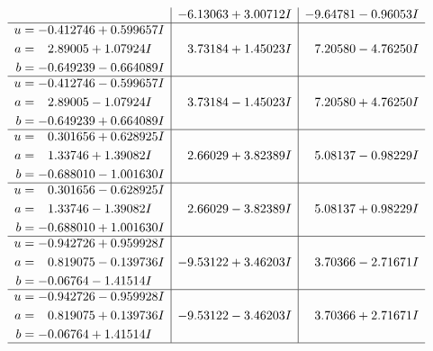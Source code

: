 \documentclass[1p]{elsarticle_modified}
\theoremstyle{definition}
\begin{document}
$$\begin{array}{c|c|c}
 & -6.13063 + 3.00712 I & -9.64781 - 0.96053 I \\ \hline\begin{aligned}
u &= -0.412746 + 0.599657 I \\
a &= \phantom{-}2.89005 + 1.07924 I \\
b &= -0.649239 - 0.664089 I\end{aligned}
 & \phantom{-}3.73184 + 1.45023 I & \phantom{-}7.20580 - 4.76250 I \\ \hline\begin{aligned}
u &= -0.412746 - 0.599657 I \\
a &= \phantom{-}2.89005 - 1.07924 I \\
b &= -0.649239 + 0.664089 I\end{aligned}
 & \phantom{-}3.73184 - 1.45023 I & \phantom{-}7.20580 + 4.76250 I \\ \hline\begin{aligned}
u &= \phantom{-}0.301656 + 0.628925 I \\
a &= \phantom{-}1.33746 + 1.39082 I \\
b &= -0.688010 - 1.001630 I\end{aligned}
 & \phantom{-}2.66029 + 3.82389 I & \phantom{-}5.08137 - 0.98229 I \\ \hline\begin{aligned}
u &= \phantom{-}0.301656 - 0.628925 I \\
a &= \phantom{-}1.33746 - 1.39082 I \\
b &= -0.688010 + 1.001630 I\end{aligned}
 & \phantom{-}2.66029 - 3.82389 I & \phantom{-}5.08137 + 0.98229 I \\ \hline\begin{aligned}
u &= -0.942726 + 0.959928 I \\
a &= \phantom{-}0.819075 - 0.139736 I \\
b &= -0.06764 - 1.41514 I\end{aligned}
 & -9.53122 + 3.46203 I & \phantom{-}3.70366 - 2.71671 I \\ \hline\begin{aligned}
u &= -0.942726 - 0.959928 I \\
a &= \phantom{-}0.819075 + 0.139736 I \\
b &= -0.06764 + 1.41514 I\end{aligned}
 & -9.53122 - 3.46203 I & \phantom{-}3.70366 + 2.71671 I\\
 \hline 
 \end{array}$$\newpage\newpage\renewcommand{\arraystretch}{1}
\end{document}
